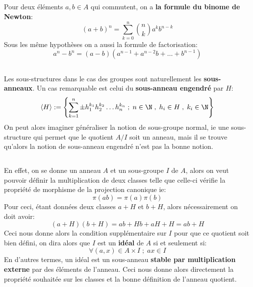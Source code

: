 \subsection*{}
Pour deux éléments \(a, b \in A\) qui commutent, on a \textbf{la formule du binome de Newton}:
\[
   (a + b)^n = \sum_{k=0}^{n}\binom{n}{k} a^k b^{n-k}   
\]
Sous les même hypothèses on a aussi la formule de factorisation:
\[ 
   a^n - b^n = (a-b)(a^{n-1} + a^{n-2}b + \ldots + b^{n-1}) 
\]
\subsection*{}
Les sous-structures dans le cas des groupes sont naturellement les \textbf{sous-anneaux}. Un cas remarquable est celui du \textbf{sous-anneau engendré} par \(H\):
\[ 
   \langle H \rangle := \left\{ \sum_{k=1}^{n} \pm h_1^{k_1}h_2^{k_2} \ldots h_n^{k_n}\; ; \; n \in \N \; , \; h_i \in H \; , \; k_i \in \N \right\}
\]
On peut alors imaginer généraliser la notion de sous-groupe normal, ie une sous-structure qui permet que le quotient \( A/I \) soit un anneau, mais il se trouve qu'alors la notion de sous-anneau engendré n'est pas la bonne notion.
\subsection*{}
En effet, on se donne un anneau \( A \) et un sous-groupe \( I \) de \( A \), alors on veut pouvoir définir la multiplication de deux classes telle que celle-ci vérifie la propriété de morphisme de la projection canonique ie:
\[ 
   \pi(ab) = \pi(a)\pi(b)
\]
Pour ceci, étant données deux classes \( a + H \) et \( b + H \), alors nécessairement on doit avoir:
\[ 
   (a + H)(b + H) = ab + Hb + aH + H = ab + H
\]
Ceci nous donne alors la condition supplémentaire sur \( I \) pour que ce quotient soit bien défini, on dira alors que \( I \) est un \textbf{idéal} de \( A \) si et seulement si:
\[ 
   \forall (a, x) \in A \times I \; ; \; ax \in I
\]
En d'autres termes, un idéal est un sous-anneau \textbf{stable par multiplication externe} par des éléments de l'anneau. Ceci nous donne alors directement la propriété souhaitée sur les classes et la bonne définition de l'anneau quotient.
